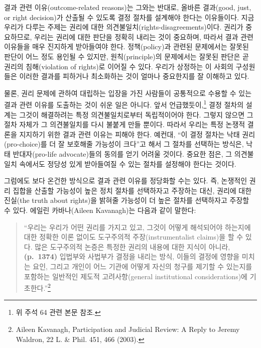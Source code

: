 \documentclass[a4paper,12pt,oneside]{article}  %
\begin{document}
결과 관련 이유(outcome-related reasons)는 그와는 반대로, 올바른
결과(good, just, or right decision)가 산출될 수 있도록 결정 절차를
설계해야 한다는 이유들이다. 지금 우리가 다루는 주제는 권리에 대한
의견불일치(rights-disagreements)이다. 권리가 중요하므로, 우리는 권리에
대한 판단을 정확히 내리는 것이 중요하며, 따라서 결과 관련 이유들을 매우
진지하게 받아들여야 한다. 정책(policy)과 관련된 문제에서는 잘못된 판단이
어느 정도 용인될 수 있지만, 원칙(principle)의 문제에서는 잘못된 판단은
곧 권리의 침해(violation of rights)로 이어질 수 있다. 우리가 상정하는 이
사회의 구성원들은 이러한 결과를 피하거나 최소화하는 것이 얼마나
중요한지를 잘 이해하고 있다.

물론, 권리 문제에 관하여 대립하는 입장을 가진 사람들이 공통적으로 수용할
수 있는 결과 관련 이유를 도출하는 것이 쉬운 일은 아니다. 앞서
언급했듯이,\footnote{위 주석 64 관련 본문 참조.} 결정 절차의 설계는
그것이 해결하려는 특정 의견불일치로부터 독립적이어야 한다. 그렇지 않으면
그 절차 자체가 그 의견불일치를 다시 불붙게 만들 뿐이다. 따라서 우리는
특정 논쟁적 결론을 지지하기 위한 결과 관련 이유는 피해야 한다. 예컨대,
``이 결정 절차는 낙태 권리(pro-choice)를 더 잘 보호해줄 가능성이
크다''고 해서 그 절차를 선택하는 방식은, 낙태 반대자(pro-life
advocate)들의 동의를 얻기 어려울 것이다. 중요한 점은, 그 의견불일치
속에서도 정당성 있게 받아들여질 수 있는 절차를 설정해야 한다는 것이다.

그럼에도 보다 온건한 방식으로 결과 관련 이유를 정당화할 수는 있다. 즉,
논쟁적인 권리 집합을 산출할 가능성이 높은 정치 절차를 선택하자고
주장하는 대신, 권리에 대한 진실(the truth about rights)을 밝혀줄
가능성이 더 높은 절차를 선택하자고 주장할 수 있다. 에일린 카바나(Aileen
Kavanagh)는 다음과 같이 말한다:

\begin{quote}
``우리는 우리가 어떤 권리를 가지고 있고, 그것이 어떻게 해석되어야
하는지에 대한 정확한 이론 없이도 도구주의적 주장(instrumentalist
claims)을 할 수 있다. 많은 도구주의적 논증은 특정한 권리의 내용에 대한
지식이 아니라, \textbf{(p.~1374)} 입법부와 사법부가 결정을 내리는 방식,
이들의 결정에 영향을 미치는 요인, 그리고 개인이 어느 기관에 어떻게
자신의 청구를 제기할 수 있는지를 포함하는 일반적인 제도적
고려사항(general institutional considerations)에 기초한다.''\footnote{Aileen
  Kavanagh, Participation and Judicial Review: A Reply to Jeremy
  Waldron, 22 L. \& Phil. 451, 466 (2003).}
\end{quote}
\end{document}
